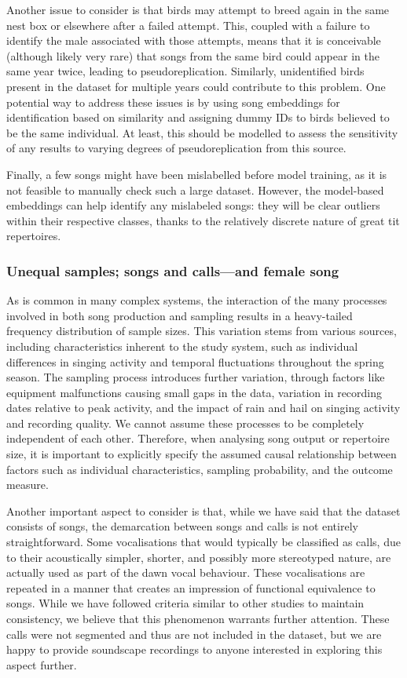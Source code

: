Another issue to consider is that birds may attempt to breed again in the same nest box or elsewhere after a failed attempt. This, coupled with a failure to identify the male associated with those attempts, means that it is conceivable (although likely very rare) that songs from the same bird could appear in the same year twice, leading to pseudoreplication. Similarly, unidentified birds present in the dataset for multiple years could contribute to this problem. One potential way to address these issues is by using song embeddings for identification based on similarity and assigning dummy IDs to birds believed to be the same individual. At least, this should be modelled to assess the sensitivity of any results to varying degrees of pseudoreplication from this source.

Finally, a few songs might have been mislabelled before model training, as it is not feasible to manually check such a large dataset. However, the model-based embeddings can help identify any mislabeled songs: they will be clear outliers within their respective classes, thanks to the relatively discrete nature of great tit repertoires.


\subsubsection{Unequal samples; songs and calls---and female song}

As is common in many complex systems, the interaction of the many processes involved in both song production and sampling results in a heavy-tailed frequency distribution of sample sizes. This variation stems from various sources, including characteristics inherent to the study system, such as individual differences in singing activity and temporal fluctuations throughout the spring season. The sampling process introduces further variation, through factors like equipment malfunctions causing small gaps in the data, variation in recording dates relative to peak activity, and the impact of rain and hail on singing activity and recording quality. We cannot assume these processes to be completely independent of each other. Therefore, when analysing song output or repertoire size, it is important to explicitly specify the assumed causal relationship between factors such as individual characteristics, sampling probability, and the outcome measure.

Another important aspect to consider is that, while we have said that the dataset consists of songs, the demarcation between songs and calls is not entirely straightforward. Some vocalisations that would typically be classified as calls, due to their acoustically simpler, shorter, and possibly more stereotyped nature, are actually used as part of the dawn vocal behaviour. These vocalisations are repeated in a manner that creates an impression of functional equivalence to songs. While we have followed criteria similar to other studies \parencite{baker1986, fayet2014, krebs1978, rivera-gutierrez2010a} to maintain consistency, we believe that this phenomenon warrants further attention. These calls were not segmented and thus are not included in the dataset, but we are happy to provide soundscape recordings to anyone interested in exploring this aspect further.

